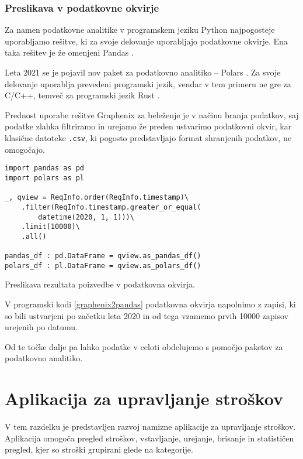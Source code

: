 \documentclass[a4paper,12pt,openright]{book}
\begin{document}
    \subsubsection{Preslikava v podatkovne okvirje}

    Za namen podatkovne analitike v programskem jeziku Python najpogosteje uporabljamo rešitve, ki za svoje delovanje uporabljajo podatkovne okvirje. Ena taka rešitev je že omenjeni Pandas \cite{PANDAS_GITHUB}.
    
    Leta 2021 se je pojavil nov paket za podatkovno analitiko – Polars \cite{POLARS}. Za svoje delovanje uporablja prevedeni programski jezik, vendar v tem primeru ne gre za C/C++, temveč za programski jezik Rust \cite{RUST}.

    Prednost uporabe rešitve Graphenix za beleženje je v načinu branja podatkov, saj podatke zlahka filtriramo in urejamo že preden ustvarimo podatkovni okvir, kar klasične datoteke {\tt .csv}, ki pogosto predstavljajo format shranjenih podatkov, ne omogočajo.

\begin{code}
\begin{verbatim}
import pandas as pd
import polars as pl

_, qview = ReqInfo.order(ReqInfo.timestamp)\
    .filter(ReqInfo.timestamp.greater_or_equal(
        datetime(2020, 1, 1)))\
    .limit(10000)\
    .all()

pandas_df : pd.DataFrame = qview.as_pandas_df()
polars_df : pl.DataFrame = qview.as_polars_df()
\end{verbatim}
\caption{Preslikava rezultata poizvedbe v podatkovna okvirja.}
\label{graphenix2pandas}
\end{code}

    \noindent
    V programski kodi \ref{graphenix2pandas} podatkovna okvirja napolnimo z zapisi, ki so bili ustvarjeni po začetku leta 2020 in od tega vzamemo prvih \num{10000} zapisov urejenih po datumu.

    Od te točke dalje pa lahko podatke v celoti obdelujemo s pomočjo paketov za podatkovno analitiko.

    \newpage
    \section{Aplikacija za upravljanje stroškov}

    V tem razdelku je predstavljen razvoj namizne aplikacije za upravljanje stroškov. Aplikacija omogoča pregled stroškov, vstavljanje, urejanje, brisanje in statističen pregled, kjer so stroški grupirani glede na kategorije.
\end{document}
